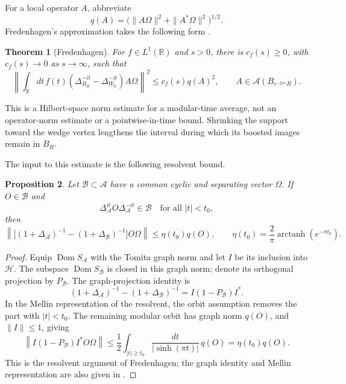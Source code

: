 \documentclass[a4paper,11pt]{article}
\newtheorem{theorem}{Theorem}
\newtheorem{proposition}[theorem]{Proposition}
\theoremstyle{definition}
\begin{document}
For a local operator $A$, abbreviate
\begin{equation}
 q(A)=\bigl(\|A\Omega\|^2+\|A^*\Omega\|^2\bigr)^{1/2}.
\end{equation}
Fredenhagen's approximation takes the following form \cite{fredenhagen}.
\begin{theorem}[Fredenhagen]\label{thm:fredenhagen}
For $f\in L^1(\mathbb R)$ and $s>0$, there is $c_f(s)\geq0$, with $c_f(s)\to0$ as $s\to\infty$, such that
\begin{equation}
 \left\|\int_{\mathbb R}dt\,f(t)
 (\Delta_{B_R}^{-it}-\Delta_{W_0}^{-it})A\Omega\right\|^2
 \leq c_f(s)q(A)^2,
 \qquad A\in\mathcal A(B_{e^{-2\pi s}R}).
\end{equation}
\end{theorem}
This is a Hilbert-space norm estimate for a modular-time average, not an operator-norm estimate or a pointwise-in-time bound. Shrinking the support toward the wedge vertex lengthens the interval during which its boosted images remain in $B_R$.

The input to this estimate is the following resolvent bound.
\begin{proposition}\label{prop:resolvent}
Let $\mathcal B\subset\mathcal A$ have a common cyclic and separating vector $\Omega$. If $O\in\mathcal B$ and
\[
 \Delta_\mathcal A^{it}O\Delta_\mathcal A^{-it}\in\mathcal B
 \quad\text{for all }|t|<t_0,
\]
then
\begin{equation}
 \left\|\bigl[(1+\Delta_\mathcal A)^{-1}
 -(1+\Delta_\mathcal B)^{-1}\bigr]O\Omega\right\|
 \leq\eta(t_0)q(O),
 \qquad \eta(t_0)=\frac2\pi\operatorname{arctanh}(e^{-\pi t_0}).
 \label{eq:approx-resolvent}
\end{equation}
\end{proposition}
\begin{proof}
Equip $\operatorname{Dom}S_\mathcal A$ with the Tomita graph norm and let $I$ be its inclusion into $\mathcal H$. The subspace $\operatorname{Dom}S_\mathcal B$ is closed in this graph norm; denote its orthogonal projection by $P_\mathcal B$. The graph-projection identity is
\[
 (1+\Delta_\mathcal A)^{-1}-(1+\Delta_\mathcal B)^{-1}
 =I(1-P_\mathcal B)I^*.
\]
In the Mellin representation of the resolvent, the orbit assumption removes the part with $|t|<t_0$. The remaining modular orbit has graph norm $q(O)$, and $\|I\|\leq1$, giving
\[
 \left\|I(1-P_\mathcal B)I^*O\Omega\right\|
 \leq\frac12\int_{|t|\geq t_0}\frac{dt}{|\sinh(\pi t)|}\,q(O)
 =\eta(t_0)q(O).
\]
This is the resolvent argument of Fredenhagen; the graph identity and Mellin representation are also given in \cite[Section~3]{Hollands2019Edge}.
\end{proof}
\end{document}
